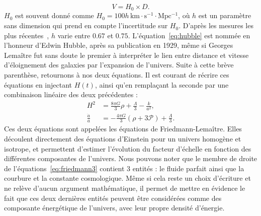 \documentclass[11pt, twoside, a4paper, openright]{report}
\begin{document}
\begin{equation}
  \label{eq:hubble}
  V = H_0 \times D.
\end{equation}
$H_0$ est souvent donné comme $H_0 = 100 h\,\mathrm{km \cdot s^{-1} \cdot Mpc^{-1}}$, où $h$ est un paramètre sans dimension qui prend en compte l'incertitude sur $H_0$. D'après les mesures les plus récentes~\cite{CITE planck + Riess ?}, $h$ varie entre $\num{0,67}$ et $\num{0,75}$.
L'équation~\ref{eq:hubble} est nommée en l'honneur d'Edwin Hubble, après sa publication en 1929, même si Georges Lemaître fut sans doute le premier à interpréter le lien entre distance et vitesse d'éloignement des galaxies par l'expansion de l'univers.
Suite à cette brève parenthèse, retournons à nos deux équations. Il est courant de récrire ces équations en injectant $H(t)$, ainsi qu'en remplaçant la seconde par une combinaison linéaire des deux précédentes :
\begin{align}
  \label{eq:friedmann3}
  H^2 &= \frac{8 \pi G}{3} \rho + \frac{\Lambda}{3} - \frac{k}{a^2} ,\\
  \label{eq:friedmann4}
  \frac{\ddot{a}}{a} &= - \frac{4 \pi G}{3} (\rho + 3 \mathcal{P}) + \frac{\Lambda}{3} .
\end{align}
Ces deux équations sont appelées les équations de Friedmann-Lemaître. Elles découlent directement des équations d'Einstein pour un univers homogène et isotrope,
et permettent d'estimer l'évolution du facteur d'échelle en fonction des différentes composantes de l'univers.
Nous pouvons noter que le membre de droite de l'équations~\ref{eq:friedmann3} contient 3 entités : le fluide parfait ainsi que la courbure et la constante cosmologique. Même si cela reste un choix d'écriture et ne relève d'aucun argument mathématique, il permet de mettre en évidence le fait que ces deux dernières entités peuvent être considérées comme des composante énergétique de l'univers, avec leur propre densité d'énergie.
\end{document}
